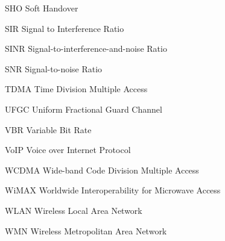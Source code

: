 \begin{denotation}
  \item[SHO] Soft Handover
  \item[SIR] Signal to Interference Ratio
  \item[SINR]Signal-to-interference-and-noise Ratio
  \item[SNR] Signal-to-noise Ratio
  \item[TDMA]Time Division Multiple Access
  \item[UFGC] Uniform Fractional Guard Channel
  \item[VBR] Variable Bit Rate
  \item[VoIP] Voice over Internet Protocol 
  \item[WCDMA] Wide-band Code Division Multiple Access
  \item[WiMAX] Worldwide Interoperability for Microwave Access
  \item[WLAN] Wireless Local Area Network
  \item[WMN] Wireless Metropolitan Area Network
\end{denotation}
